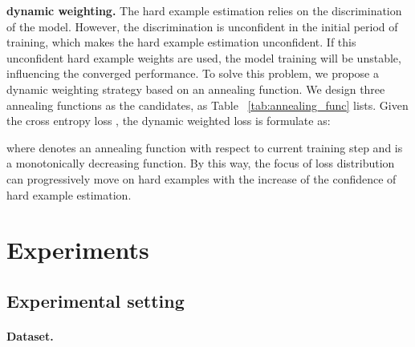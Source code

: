 \documentclass[10pt,twocolumn,letterpaper]{article}
\begin{document}
\textbf{dynamic weighting.}
The hard example estimation relies on the discrimination of the model.
However, the discrimination is unconfident in the initial period of training, which makes the hard example estimation unconfident.
If this unconfident hard example weights are used, the model training will be unstable, influencing the converged performance.
To solve this problem, we propose a dynamic weighting strategy based on an annealing function.
We design three annealing functions as the candidates, as Table ~\ref{tab:annealing_func} lists.
Given the cross entropy loss , the dynamic weighted loss is formulate as:

where  denotes an annealing function with respect to current training step  and  is a monotonically decreasing function.
By this way, the focus of loss distribution can progressively move on hard examples with the increase of the confidence of hard example estimation.

 
\begin{table}[]
   \caption{Candidates of annealing functions.
      \label{tab:annealing_func}}
   \centering
   \renewcommand{\arraystretch}{1.5}
\end{table}

\section{Experiments}
\label{sec:exp}

\subsection{Experimental setting}

\paragraph{Dataset.}
\end{document}
